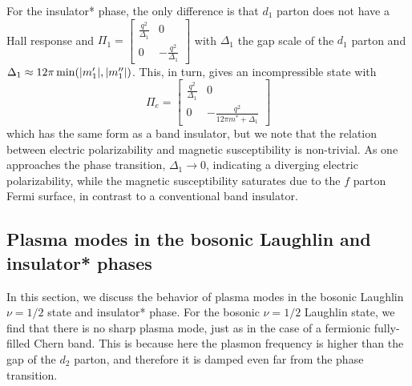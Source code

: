 \documentclass[aps,prl,twocolumn,superscriptaddress,floatfix, 10pt,longbibliography, nofootinbib]{revtex4-2}
\begin{document}
For the insulator* phase, the only difference is that $d_1$ parton does not have a Hall response and $\Pi_{1}=\begin{bmatrix}
    \frac{q^2}{\Delta_1} & 0\\
    0 & -\frac{q^2}{\Delta_1}
    \end{bmatrix}$ with $\Delta_1$ the gap scale of the $d_1$ parton and $\Delta_1\approx 12\pi \min(\abs{m_1'},\abs{m_1''})$. This, in turn, gives an incompressible state with
    \begin{equation}
        \Pi_e=\begin{bmatrix}
    \frac{q^2}{\Delta_1} & 0\\
    0 & -\frac{q^2}{12\pi m^* +\Delta_1}
    \end{bmatrix}
    \end{equation}
which has the same form as a band insulator, but we note that the relation between electric polarizability and magnetic susceptibility is non-trivial. As one approaches the phase transition, $\Delta_1\rightarrow 0$, indicating a diverging electric polarizability, while the magnetic susceptibility saturates due to the $f$ parton Fermi surface, in contrast to a conventional band insulator.







\subsection{Plasma modes in the bosonic Laughlin and insulator* phases}
In this section, we discuss the behavior of plasma modes in the bosonic Laughlin $\nu=1/2$ state and insulator* phase. For the bosonic $\nu=1/2$ Laughlin state,  we find that there is no sharp plasma mode, just as in the case of a fermionic fully-filled Chern band.  This is because here the plasmon frequency is higher than the gap of the $d_2$ parton, and therefore it is damped even far from the phase transition.
\end{document}
